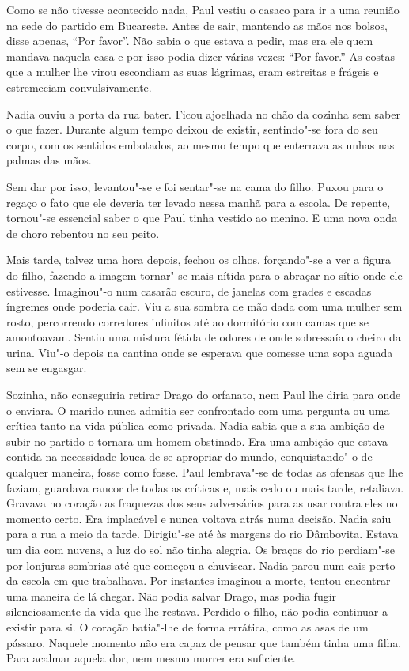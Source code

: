 Como se não tivesse acontecido nada, Paul vestiu o casaco para ir a uma
reunião na sede do partido em Bucareste. Antes de sair, mantendo as
mãos nos bolsos, disse apenas, ``Por favor''. Não sabia o que estava a
pedir, mas era ele quem mandava naquela casa e por isso podia dizer
várias vezes: ``Por favor.'' As costas que a mulher lhe virou escondiam as
suas lágrimas, eram estreitas e frágeis e estremeciam convulsivamente.

Nadia ouviu a porta da rua bater. Ficou ajoelhada no chão da cozinha sem
saber o que fazer. Durante algum tempo deixou de existir, sentindo"-se
fora do seu corpo, com os sentidos embotados, ao mesmo tempo que enterrava as unhas nas palmas das mãos.

Sem dar por isso, levantou"-se e foi sentar"-se na cama do filho. Puxou
para o regaço o fato que ele deveria ter levado nessa manhã para a
escola. De repente, tornou"-se essencial saber o que Paul tinha vestido
ao menino. E uma nova onda de choro rebentou no seu peito.

Mais tarde, talvez uma hora depois, fechou os olhos, forçando"-se a ver a
figura do filho, fazendo a imagem tornar"-se mais nítida para o abraçar
no sítio onde ele estivesse. Imaginou"-o num casarão escuro, de janelas
com grades e escadas íngremes onde poderia cair. Viu a sua sombra de mão
dada com uma mulher sem rosto, percorrendo corredores infinitos até ao
dormitório com camas que se amontoavam. Sentiu uma mistura fétida de
odores de onde sobressaía o cheiro da urina. Viu"-o depois na cantina
onde se esperava que comesse uma sopa aguada sem se engasgar.

Sozinha, não conseguiria retirar Drago do orfanato, nem Paul lhe diria
para onde o enviara. O marido nunca admitia ser confrontado com uma
pergunta ou uma crítica tanto na vida pública como privada. Nadia sabia
que a sua ambição de subir no partido o tornara um homem obstinado. Era
uma ambição que estava contida na necessidade louca de se apropriar do
mundo, conquistando"-o de qualquer maneira, fosse como fosse. Paul
lembrava"-se de todas as ofensas que lhe faziam, guardava rancor de todas
as críticas e, mais cedo ou mais tarde, retaliava. Gravava no coração as
fraquezas dos seus adversários para as usar contra eles no momento
certo. Era implacável e nunca voltava atrás numa decisão. Nadia saiu
para a rua a meio da tarde. Dirigiu"-se até às margens do rio Dâmbovita.
Estava um dia com nuvens, a
luz do sol não tinha alegria. Os braços do rio perdiam"-se por lonjuras
sombrias até que começou a chuviscar. Nadia parou num cais perto da
escola em que trabalhava. Por instantes imaginou a morte, tentou
encontrar uma maneira de lá chegar. Não podia salvar Drago, mas podia
fugir silenciosamente da vida que lhe restava. Perdido o filho, não
podia continuar a existir para si. O coração batia"-lhe de forma
errática, como as asas de um pássaro. Naquele momento não era capaz de
pensar que também tinha uma filha. Para acalmar aquela dor, nem mesmo
morrer era suficiente.

